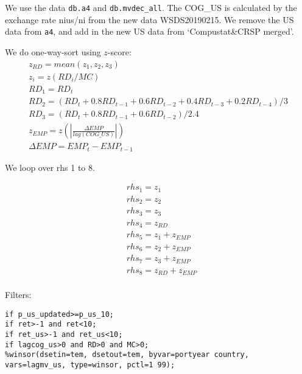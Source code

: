 

\usepackage[T1]{fontenc}




\thispagestyle{fancy}

\newcommand{\code}{\texttt}
\newcommand*{\Commonpath}{20190225}


We use the data \code{db.a4} and \code{db.mvdec\_all}. The COG\_US is calculated by the exchange rate nius/ni from the new data WSDS20190215. 
We remove the US data from \code{a4}, and add in the new US data from `Compustat\&CRSP merged'.





We do one-way-sort using $z$-score:
$$
\begin{aligned}
& z_{RD} = mean(z_1, z_2, z_3) \\
& z_i = z(RD_i/MC) \\
& RD_1 = RD_t \\
& RD_2 = (RD_t + 0.8RD_{t-1} + 0.6RD_{t-2} + 0.4RD_{t-3} + 0.2RD_{t-4})/3 \\
& RD_3 = (RD_t + 0.8RD_{t-1} + 0.6RD_{t-2})/2.4 
& \\
& z_{EMP} = z(|\frac{\Delta EMP}{lag(COG\_US)}|) \\
& \Delta EMP = EMP_t - EMP_{t-1}
\end{aligned}
$$


We loop over rhs 1 to 8.

$$
\begin{aligned}
& rhs_1 = z_1 \\
& rhs_2 = z_2 \\
& rhs_3 = z_3 \\
& rhs_4 = z_{RD} \\
& rhs_5 = z_1 + z_{EMP} \\
& rhs_6 = z_2 + z_{EMP} \\
& rhs_7 = z_3 + z_{EMP} \\
& rhs_8 = z_{RD} + z_{EMP}\\
\end{aligned}
$$ 


Filters:

\code{if p\_us\_updated>=p\_us\_10;} \\
\code{if ret>-1 and ret<10;} \\
\code{if ret\_us>-1 and ret\_us<10;} \\
\code{if lagcog\_us>0 and RD>0 and MC>0;} \\
\code{\%winsor(dsetin=tem, dsetout=tem, byvar=portyear country, vars=lagmv\_us, type=winsor, pctl=1 99);}

